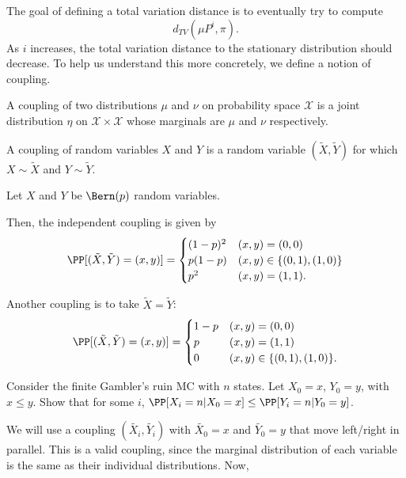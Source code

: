 The goal of defining a total variation distance is to eventually try to compute 
\[d_{TV}(\mu P^i, \pi).\]
As $i$ increases, the total variation distance to the stationary distribution should decrease. To help us understand this more concretely, we define a notion of \ac{coupling}. 

\begin{definition}

A \ac{coupling} of two distributions $\mu$ and $\nu$ on probability space $\mathcal{X}$ is a joint distribution $\eta$ on $\mathcal{X}\times \mathcal{X}$ whose marginals are $\mu$ and $\nu$ respectively. 
\end{definition}

A coupling of random variables $X$ and $Y$ is a random variable $(\tilde{X}, \tilde{Y})$ for which $X\sim \tilde{X}$ and $Y\sim \tilde{Y}$. 

\begin{example}
\exlabel

Let $X$ and $Y$ be $\Bern(p)$ random variables. 
\end{example}

Then, the independent coupling is given by
\[\PP[(\tilde{X},\tilde{Y})=(x,y)] = 
\begin{cases}
(1-p)^2 & (x,y)=(0,0) \\
p(1-p) & (x,y)\in \{(0,1),(1,0)\} \\
p^2 & (x,y) = (1,1).
\end{cases}\]

Another coupling is to take $\tilde{X}=\tilde{Y}$:
\[\PP[(\tilde{X},\tilde{Y})=(x,y)] = 
\begin{cases}
1-p & (x,y)=(0,0) \\
p & (x,y)=(1,1) \\
0 & (x,y)\in \{(0,1),(1,0)\}.
\end{cases}\]

\begin{example}
\exlabel

Consider the finite Gambler's ruin MC with $n$ states. Let $X_0=x$, $Y_0=y$, with $x\leq y$. Show that for some $i$, $\PP[X_i=n|X_0=x]\leq \PP[Y_i=n|Y_0=y]$. 
\end{example}

We will use a coupling $(\tilde{X_i}, \tilde{Y_i})$ with $\tilde{X_0}=x$ and $\tilde{Y_0}=y$ that move left/right in parallel. This is a valid coupling, since the marginal distribution of each variable is the same as their individual distributions. Now, 


